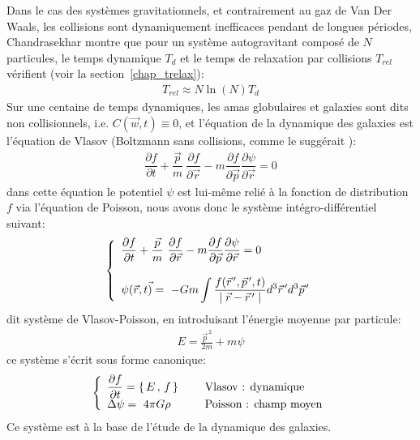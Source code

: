 Dans le cas des systèmes gravitationnels, et contrairement au gaz de Van Der Waals, les collisions sont dynamiquement inefficaces pendant de longues
périodes, Chandrasekhar montre que pour un système autogravitant composé de $N$ particules, le temps dynamique $T_{d}$ et le temps de
relaxation par collisions $T_{rel}$ vérifient (voir la section~\ref{chap_trelax}):
\begin{align*}
	T_{rel}\approx N\ln\left(  N\right)  T_{d}%
\end{align*}
Sur une centaine de temps dynamiques, les amas globulaires et galaxies sont dits non collisionnels, i.e. $C\left(  \vec{w}
,t\right)  \equiv0$, et l'équation de la dynamique des galaxies est l'équation de Vlasov (Boltzmann sans collisions, comme le suggérait \citet{1982A&A...114..211H}):
\begin{align*}
	\dfrac{\partial f}{\partial t}+\dfrac{\vec{p}}{m}\ \dfrac{\partial f}{\partial\vec{r}}-m\dfrac{\partial f}{\partial\vec{p}}\dfrac
	{\partial\psi}{\partial\vec{r}}=0
\end{align*}
dans cette équation le potentiel $\psi$ est lui-même relié à la fonction de distribution $f$ via l'équation de Poisson, nous avons donc le système
intégro-différentiel suivant:
\begin{align*}
	\left\{
		\begin{array}[c]{l}%
			\dfrac{\partial f}{\partial t}+\dfrac{\vec{p}}{m}\ \dfrac{\partial f}{\partial\vec{r}}-m\dfrac{\partial f}{\partial\vec{p}}\dfrac
			{\partial\psi}{\partial\vec{r}}=0\\
			\\
			\psi(\vec{r},t\vec{)}=~-Gm\displaystyle\int\dfrac{f(\vec{r}^{\,\prime},\vec{p}^{\,\prime},t)}{\mid\vec{r}-\vec{r}^{\,\prime}\mid}%
			d^{3}\vec{r}^{\,\prime}d^{3}\vec{p}^{\,\prime}%
		\end{array}
	\right.
\end{align*}
dit système de Vlasov-Poisson, en introduisant l'énergie moyenne par particule:
\begin{align*}
	E=\frac{\vec{p}^{\,2}}{2m}+m\psi
\end{align*}
ce système s'écrit sous forme canonique:
\begin{align*}
	\left\{
		\begin{array}[c]{lll}%
			\dfrac{\partial f}{\partial t}=\left\{  \,E\,,\,f\,\right\}   &  & \text{{\ {Vlasov} : dynamique}}\\
			\Delta\psi=~4\pi G\rho &  & \text{{\ {Poisson} : champ {moyen}}}%
		\end{array}
	\right.
\end{align*}
Ce système est à la base de l'étude de la dynamique des galaxies.

